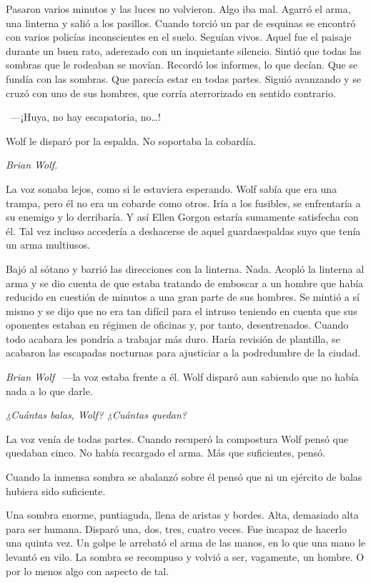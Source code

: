 Pasaron varios minutos y las luces no volvieron. Algo iba mal. Agarró el arma, una linterna y salió a los pasillos. Cuando torció un par de esquinas se encontró con varios policías inconscientes en el suelo. Seguían vivos. Aquel fue el paisaje durante un buen rato, aderezado con un inquietante silencio. Sintió que todas las sombras que le rodeaban se movían. Recordó los informes, lo que decían. Que se fundía con las sombras. Que parecía estar en todas partes. Siguió avanzando y se cruzó con uno de sus hombres, que corría aterrorizado en sentido contrario.

~---¡Huya, no hay escapatoria, no\dots!

Wolf le disparó por la espalda. No soportaba la cobardía.

\emph{Brian Wolf.}

La voz sonaba lejos, como si le estuviera esperando. Wolf sabía que era una trampa, pero él no era un cobarde como otros. Iría a los fusibles, se enfrentaría a su enemigo y lo derribaría. Y así Ellen Gorgon estaría sumamente satisfecha con él. Tal vez incluso accedería a deshacerse de aquel guardaespaldas suyo que tenía un arma multiusos.

Bajó al sótano y barrió las direcciones con la linterna. Nada. Acopló la linterna al arma y se dio cuenta de que estaba tratando de emboscar a un hombre que había reducido en cuestión de minutos a una gran parte de sus hombres. Se mintió a sí mismo y se dijo que no era tan difícil para el intruso teniendo en cuenta que sus oponentes estaban en régimen de oficinas y, por tanto, desentrenados. Cuando todo acabara les pondría a trabajar más duro. Haría revisión de plantilla, se acabaron las escapadas nocturnas para ajusticiar a la podredumbre de la ciudad.

\emph{Brian Wolf} ~---la voz estaba frente a él. Wolf disparó aun sabiendo que no había nada a lo que darle.

\emph{¿Cuántas balas, Wolf? ¿Cuántas quedan?}

La voz venía de todas partes. Cuando recuperó la compostura Wolf pensó que quedaban cinco. No había recargado el arma. Más que suficientes, pensó.

Cuando la inmensa sombra se abalanzó sobre él pensó que ni un ejército de balas hubiera sido suficiente.

Una sombra enorme, puntiaguda, llena de aristas y bordes. Alta, demasiado alta para ser humana. Disparó una, dos, tres, cuatro veces. Fue incapaz de hacerlo una quinta vez. Un golpe le arrebató el arma de las manos, en lo que una mano le levantó en vilo. La sombra se recompuso y volvió a ser, vagamente, un hombre. O por lo menos algo con aspecto de tal.

